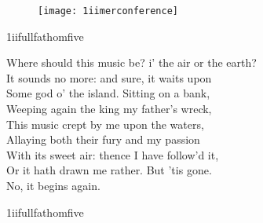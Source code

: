 \begin{pictures} %
	
\end{pictures}



\begin{figure}[tbh]
\centering
\texttt{[image: 1iimerconference]}
\end{figure}



\begin{pictures} %
	\begin{a4}
		\begin{bwbigpic}
		[\picwidth]
		{1iifullfathomfive}
		{}
		\end{bwbigpic}
	\end{a4}
\end{pictures}

\begin{verse_speech}[Ferdinand] 
Where should this music be? i' the air or the earth?\\
It sounds no more: and sure, it waits upon\\
Some god o' the island. Sitting on a bank,\\
Weeping again the king my father's wreck,\\
This music crept by me upon the waters,\\
Allaying both their fury and my passion\\
With its sweet air: thence I have follow'd it,\\
Or it hath drawn me rather. But 'tis gone.\\
No, it begins again.
\begin{song}
\end{song}
\end{verse_speech}




\begin{pictures} %
	\begin{letter}
		\begin{bwbigpic}
		[\picwidth]
		{1iifullfathomfive}
		{}
		\end{bwbigpic}
	\end{letter}
\end{pictures}



